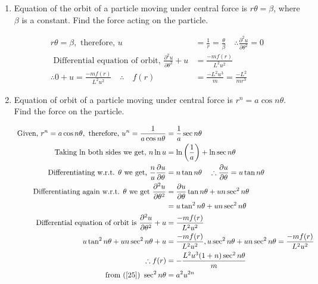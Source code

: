 \begin{enumerate}
	\item  Equation of the orbit of a particle moving under central force is $r \theta=\beta$, where $\beta$ is a constant. Find the force acting on the particle.
	\begin{answer}
		\begin{align*}
		r \theta=\beta,\text{ therefore, }u&=\frac{1}{r}=\frac{\theta}{\beta} \quad \therefore \frac{\partial^{2} u}{\partial \theta^{2}}=0\\
		\text{	Differential equation of orbit, }\frac{\partial^{2} u}{\partial \theta^{2}}+u&=\frac{-m f(r)}{L^{2} u^{2}}\\
		\therefore 0+u=\frac{-m f(r)}{L^{2} u^{2}} \quad \therefore \quad f(r)&=\frac{-L^{2} u^{3}}{m}=\frac{-L^{2}}{m r^{3}}
		\end{align*}
	\end{answer}
	\item  Equation of orbit of a particle moving under central force is $r^{n}=a \cos n \theta .$ Find the force on the particle.
	\begin{answer}
		\begin{align}
		\text{	Given, }r^{n}=a \cos n \theta,\text{ therefore, }u^{n}=\frac{1}{a \cos n \theta}&=\frac{1}{a} \sec n \theta \label{25}\\
		\text{ Taking $\ln$ both sides we get, }n \ln u&=\ln \left(\frac{1}{a}\right)+\ln \sec n \theta\notag\\
		\text{Differentiating w.r.t. $\theta$ we get, }\frac{n}{u} \frac{\partial u}{\partial \theta}&=n \tan n \theta \quad \therefore \frac{\partial u}{\partial \theta}=u \tan n \theta\notag\\
		\text{Differentiating again w.r.t. $\theta$ we get }\frac{\partial^{2} u}{\partial \theta^{2}}&=\frac{\partial u}{\partial \theta} \tan n \theta+u n \sec ^{2} n \theta\notag\\&=u \tan ^{2} n \theta+u n \sec ^{2} n \theta\notag\\
		\text{ Differential equation of orbit is }\frac{\partial^{2} u}{\partial \theta^{2}}+u&=\frac{-m f(r)}{L^{2} u^{2}}\notag\\
		u \tan ^{2} n \theta+u n \sec ^{2} n \theta+u&=\frac{-m f(r)}{L^{2} u^{2}}, u \sec ^{2} n \theta+u n \sec ^{2} n \theta=\frac{-m f(r)}{L^{2} u^{2}}\notag\\
		\therefore f(r)&=-\frac{L^{2} u^{3}(1+n) \sec ^{2} n \theta}{m}\notag\\
		\text{from (\ref{25}) }\sec ^{2} n \theta&=a^{2} u^{2 n}\notag\\

\end{align}
\end{answer}
\end{enumerate}

